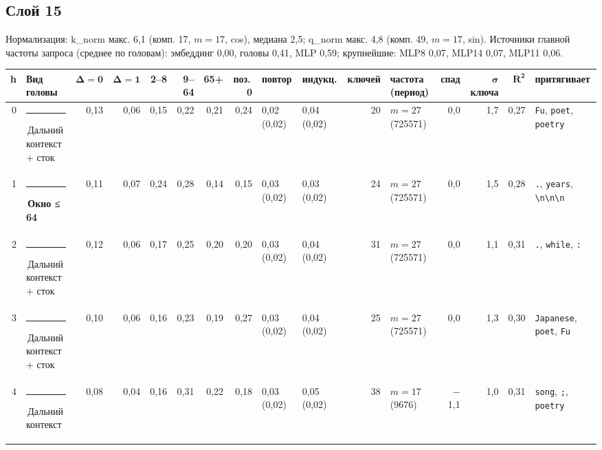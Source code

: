 \documentclass[10pt]{article}
\begin{document}
\noindent\begin{minipage}{\linewidth}
\subsection*{Слой 15}
{\small\color{ink2} Нормализация: k\_norm макс. 6,1 (комп. 17, $m{=}17$, cos), медиана 2,5; q\_norm макс. 4,8 (комп. 49, $m{=}17$, sin). Источники главной частоты запроса (среднее по головам): эмбеддинг 0,00, головы 0,41, MLP 0,59; крупнейшие: MLP8 0,07, MLP14 0,07, MLP11 0,06.}
\begin{center}{\footnotesize\begin{tabular}{|r|l|r|r|r|r|r|r|l|l|r|l|r|r|r|l|}
\hline
\rowcolor{head}\textbf{h} & \textbf{Вид головы} & $\boldsymbol{\Delta{=}0}$ & $\boldsymbol{\Delta{=}1}$ & \textbf{2–8} & \textbf{9–64} & \textbf{65+} & \textbf{поз.\,0} & \textbf{повтор} & \textbf{индукц.} & \textbf{ключей} & \textbf{частота (период)} & \textbf{спад} & $\boldsymbol{\sigma}$ \textbf{ключа} & $\boldsymbol{R^2}$ & \textbf{притягивает} \\ \hline
0 & \textcolor[HTML]{C3C2B7}{\rule{0.62em}{0.62em}}\,Дальний контекст + сток & 0,13 & 0,06 & 0,15 & 0,22 & 0,21 & 0,24 & 0,02 (0,02) & 0,04 (0,02) & 20 & $m{=}27$ (725571) & 0,0 & 1,7 & 0,27 & \texttt{\textvisiblespace{}Fu}, \texttt{\textvisiblespace{}poet}, \texttt{\textvisiblespace{}poetry} \\ \hline
1 & \textcolor[HTML]{EDA100}{\rule{0.62em}{0.62em}}\,\textbf{Окно ≤ 64} & 0,11 & 0,07 & 0,24 & 0,28 & 0,14 & 0,15 & 0,03 (0,02) & 0,03 (0,02) & 24 & $m{=}27$ (725571) & 0,0 & 1,5 & 0,28 & \texttt{\textvisiblespace{}.}, \texttt{\textvisiblespace{}years}, \texttt{\textvisiblespace{}\textbackslash{}n\textbackslash{}n\textbackslash{}n} \\ \hline
2 & \textcolor[HTML]{C3C2B7}{\rule{0.62em}{0.62em}}\,Дальний контекст + сток & 0,12 & 0,06 & 0,17 & 0,25 & 0,20 & 0,20 & 0,03 (0,02) & 0,04 (0,02) & 31 & $m{=}27$ (725571) & 0,0 & 1,1 & 0,31 & \texttt{\textvisiblespace{}.}, \texttt{\textvisiblespace{}while}, \texttt{\textvisiblespace{}:} \\ \hline
3 & \textcolor[HTML]{C3C2B7}{\rule{0.62em}{0.62em}}\,Дальний контекст + сток & 0,10 & 0,06 & 0,16 & 0,23 & 0,19 & 0,27 & 0,03 (0,02) & 0,04 (0,02) & 25 & $m{=}27$ (725571) & 0,0 & 1,3 & 0,30 & \texttt{\textvisiblespace{}Japanese}, \texttt{\textvisiblespace{}poet}, \texttt{\textvisiblespace{}Fu} \\ \hline
4 & \textcolor[HTML]{C3C2B7}{\rule{0.62em}{0.62em}}\,Дальний контекст & 0,08 & 0,04 & 0,16 & 0,31 & 0,22 & 0,18 & 0,03 (0,02) & 0,05 (0,02) & 38 & $m{=}17$ (9676) & $-$1,1 & 1,0 & 0,31 & \texttt{\textvisiblespace{}song}, \texttt{\textvisiblespace{};}, \texttt{\textvisiblespace{}poetry} \\ \hline

\end{tabular}}
\end{center}
\end{minipage}
\end{document}
